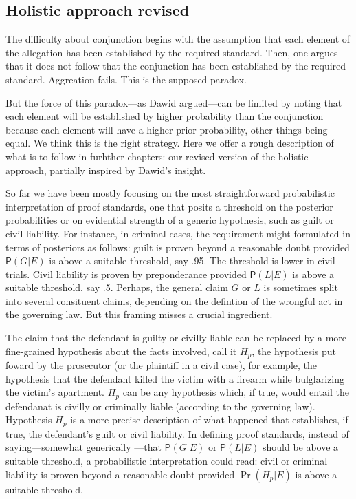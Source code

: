 \documentclass[
  10pt,
  dvipsnames,enabledeprecatedfontcommands]{scrartcl}
\newcommand{\pr}[1]{\mathsf{P}(#1)}
\begin{document}
\hypertarget{holistic-approach-revised}{%
\subsection{Holistic approach revised}\label{holistic-approach-revised}}

The difficulty about conjunction begins with the assumption that each
element of the allegation has been established by the required standard.
Then, one argues that it does not follow that the conjunction has been
established by the required standard. Aggreation fails. This is the
supposed paradox.

But the force of this paradox---as Dawid argued---can be limited by
noting that each element will be established by higher probability than
the conjunction because each element will have a higher prior
probability, other things being equal. We think this is the right
strategy. Here we offer a rough description of
what is to follow in furhther chapters: our revised version of the
holistic approach, partially inspired by Dawid's insight.

So far we have been mostly focusing on the most straightforward
probabilistic interpretation of proof standards, one that posits a
threshold on the posterior probabilities or on evidential strength of a
generic hypothesis, such as guilt or civil liability. For instance, in
criminal cases, the requirement might formulated in terms of posteriors
as follows: guilt is proven beyond a reasonable doubt provided
\(\pr{G \vert E}\) is above a suitable threshold, say .95. The threshold
is lower in civil trials. Civil liability is proven by preponderance
provided \(\pr{L \vert E}\) is above a suitable threshold, say .5.
Perhaps, the general claim \(G\) or \(L\) is sometimes split into
several consituent claims, depending on the defintion of the wrongful
act in the governing law. But this framing misses a crucial ingredient.

The claim that the defendant is guilty or civilly liable can be replaced
by a more fine-grained hypothesis about the facts involved, call it
\(H_p\), the hypothesis put foward by the prosecutor (or the plaintiff
in a civil case), for example, the hypothesis that the defendant killed
the victim with a firearm while bulglarizing the victim's apartment.
\(H_p\) can be any hypothesis which, if true, would entail the
defendanat is civilly or criminally liable (according to the governing
law). Hypothesis \(H_p\) is a more precise description of what happened
that establishes, if true, the defendant's guilt or civil
liability. In defining proof standards, instead of
saying---somewhat generically ---that \(\pr{G \vert E}\) or
\(\pr{L \vert E}\) should be above a suitable threshold, a probabilistic
interpretation could read: civil or criminal liability is proven beyond
a reasonable doubt provided \(\Pr(H_p \vert E)\) is above a suitable
threshold.
\end{document}

